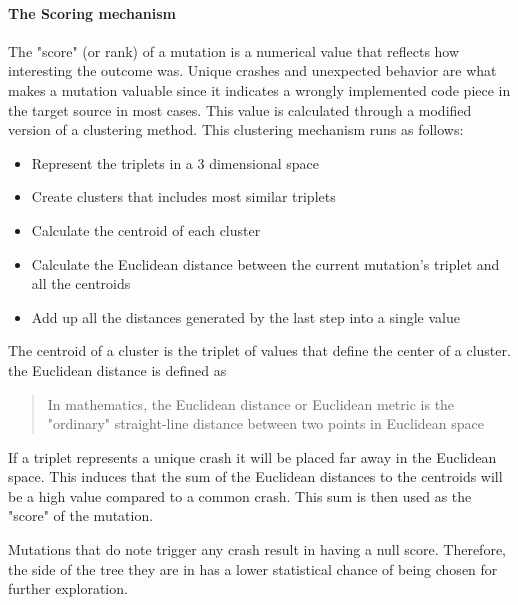 \documentclass{article}
\begin{document}
\begin{empfile}
				\paragraph{The Scoring mechanism}
The "score" (or rank) of a mutation is a numerical value that reflects how interesting the outcome was. Unique crashes and unexpected behavior are what makes a mutation valuable since it indicates a wrongly implemented code piece in the target source in most cases. \cite{CrashUniQ} This value is calculated through a modified version of a clustering method.
This clustering mechanism runs as follows:
	\begin{itemize}
	\item{Represent the triplets in a 3 dimensional space}
	\item{Create clusters that includes most similar triplets}
	\item{Calculate the centroid of each cluster}
	\item{Calculate the Euclidean distance between the current mutation's triplet and all the centroids}
	\item{Add up all the distances generated by the last step into a single value}
	\end{itemize}

The centroid of a cluster is the triplet of values that define the center of a cluster.
the Euclidean distance is defined as
	\begin{quotation}
	In mathematics, the Euclidean distance or Euclidean metric is the "ordinary" straight-line distance between two points in Euclidean space
	\end{quotation}
	
If a triplet represents a unique crash it will be placed far away in the Euclidean space. This induces that the sum of the Euclidean distances to the centroids will be a high value compared to a common crash. This sum is then used as the "score" of the mutation. 

Mutations that do note trigger any crash result in having a null score. Therefore, the side of the tree they are in has a lower statistical chance of being chosen for further exploration.


\end{empfile}
\end{document}
